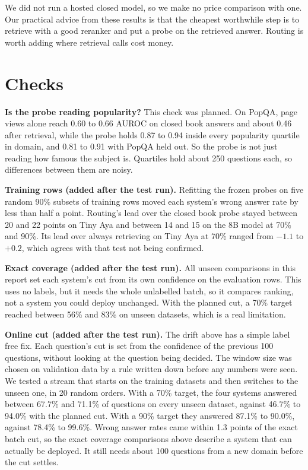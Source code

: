 \documentclass[11pt,a4paper]{article}
\begin{document}
We did not run a hosted closed model, so we make no price comparison with one. Our practical advice from these results is that the cheapest worthwhile step is to retrieve with a good reranker and put a probe on the retrieved answer. Routing is worth adding where retrieval calls cost money.

\section{Checks}
\label{sec:checks}

\textbf{Is the probe reading popularity?} This check was planned. On PopQA, page views alone reach 0.60 to 0.66 AUROC on closed book answers and about 0.46 after retrieval, while the probe holds 0.87 to 0.94 inside every popularity quartile in domain, and 0.81 to 0.91 with PopQA held out. So the probe is not just reading how famous the subject is. Quartiles hold about 250 questions each, so differences between them are noisy.

\textbf{Training rows (added after the test run).} Refitting the frozen probes on five random 90\% subsets of training rows moved each system's wrong answer rate by less than half a point. Routing's lead over the closed book probe stayed between 20 and 22 points on Tiny Aya and between 14 and 15 on the 8B model at 70\% and 90\%. Its lead over always retrieving on Tiny Aya at 70\% ranged from $-1.1$ to $+0.2$, which agrees with that test not being confirmed.

\textbf{Exact coverage (added after the test run).} All unseen comparisons in this report set each system's cut from its own confidence on the evaluation rows. This uses no labels, but it needs the whole unlabelled batch, so it compares ranking, not a system you could deploy unchanged. With the planned cut, a 70\% target reached between 56\% and 83\% on unseen datasets, which is a real limitation.

\textbf{Online cut (added after the test run).} The drift above has a simple label free fix. Each question's cut is set from the confidence of the previous 100 questions, without looking at the question being decided. The window size was chosen on validation data by a rule written down before any numbers were seen. We tested a stream that starts on the training datasets and then switches to the unseen one, in 20 random orders. With a 70\% target, the four systems answered between 67.7\% and 71.1\% of questions on every unseen dataset, against 46.7\% to 94.0\% with the planned cut. With a 90\% target they answered 87.1\% to 90.0\%, against 78.4\% to 99.6\%. Wrong answer rates came within 1.3 points of the exact batch cut, so the exact coverage comparisons above describe a system that can actually be deployed. It still needs about 100 questions from a new domain before the cut settles.
\end{document}

